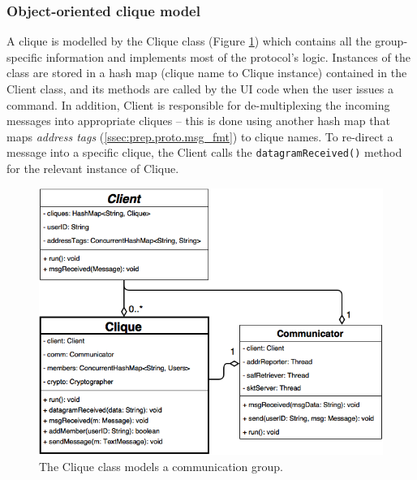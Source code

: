 \documentclass[a4paper, 12pt]{report}
\begin{document}
\subsubsection{Object-oriented clique model}
A clique is modelled by the Clique class (Figure \ref{fig:clique_uml}) which contains all the group-specific information and implements most of the protocol's logic. Instances of the class are stored in a hash map (clique name to Clique instance) contained in the Client class, and its methods are called by the UI code when the user issues a command. In addition, Client is responsible for de-multiplexing the incoming messages into appropriate cliques -- this is done using another hash map that maps \emph{address tags} (\cref{ssec:prep.proto.msg_fmt}) to clique names. To re-direct a message into a specific clique, the Client calls the \texttt{datagramReceived()} method for the relevant instance of Clique.
\begin{figure}[H]
    \centering
    \includegraphics[width=0.8\linewidth]{pics/clique_uml.png}
    \caption{\label{fig:clique_uml} The Clique class models a communication group.}
\end{figure}
\end{document}
